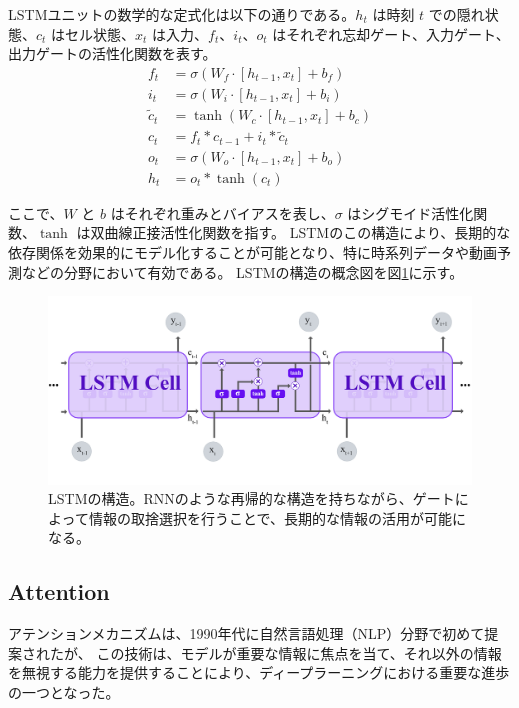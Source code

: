     LSTMユニットの数学的な定式化は以下の通りである。\( h_t \) は時刻 \( t \) での隠れ状態、\( c_t \) はセル状態、\( x_t \) は入力、\( f_t \)、\( i_t \)、\( o_t \) はそれぞれ忘却ゲート、入力ゲート、出力ゲートの活性化関数を表す。
    \begin{align}
      f_t &= \sigma(W_f \cdot [h_{t-1}, x_t] + b_f) \\
      i_t &= \sigma(W_i \cdot [h_{t-1}, x_t] + b_i) \\
      \tilde{c}_t &= \tanh(W_c \cdot [h_{t-1}, x_t] + b_c) \\
      c_t &= f_t * c_{t-1} + i_t * \tilde{c}_t \\
      o_t &= \sigma(W_o \cdot [h_{t-1}, x_t] + b_o) \\
      h_t &= o_t * \tanh(c_t)
    \end{align}
    
    ここで、\( W \) と \( b \) はそれぞれ重みとバイアスを表し、\( \sigma \) はシグモイド活性化関数、\( \tanh \) は双曲線正接活性化関数を指す。
    LSTMのこの構造により、長期的な依存関係を効果的にモデル化することが可能となり、特に時系列データや動画予測などの分野において有効である。
    LSTMの構造の概念図を図\ref{fig:lstm}に示す。
    \begin{figure}[h]
      \centering
      \includegraphics[width=1.05\textwidth]{figures/videoprediction/lstm.jpg}
      \caption{LSTMの構造。RNNのような再帰的な構造を持ちながら、ゲートによって情報の取捨選択を行うことで、長期的な情報の活用が可能になる。}
      \label{fig:lstm}
    \end{figure}
    
    \subsection{Attention}
    アテンションメカニズムは、1990年代に自然言語処理（NLP）分野で初めて提案されたが、
    この技術は、モデルが重要な情報に焦点を当て、それ以外の情報を無視する能力を提供することにより、ディープラーニングにおける重要な進歩の一つとなった。

